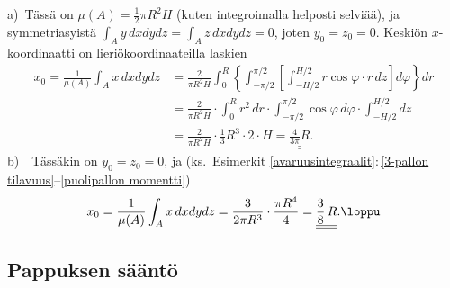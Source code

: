 \ratk a)\ Tässä on $\mu(A)=\frac{1}{2}\pi R^2H$ (kuten integroimalla helposti selviää), ja
symmetriasyistä $\int_A y\,dxdydz=\int_A z\,dxdydz=0$, joten $y_0=z_0=0$. Keskiön
$x$-koordinaatti on lieriökoordinaateilla laskien
\begin{align*}
x_0  = \frac{1}{\mu(A)}\int_A x\,dxdydz
    &= \frac{2}{\pi R^2H}\int_0^R\left\{\int_{-\pi/2}^{\pi/2}\left[\int_{-H/2}^{H/2}
         r\cos\varphi \cdot r\,dz\right]d\varphi\right\}dr \\
    &= \frac{2}{\pi R^2H}\cdot\int_0^R r^2\,dr\cdot\int_{-\pi/2}^{\pi/2}\cos\varphi\,d\varphi
                                             \cdot\int_{-H/2}^{H/2} dz \\
    &= \frac{2}{\pi R^2H} \cdot \frac{1}{3}R^3 \cdot 2 \cdot H
     =\underline{\underline{\frac{4}{3\pi}R}}.
\end{align*}
b)\ \, Tässäkin on $y_0=z_0=0$, ja
(ks.\ Esimerkit \ref{avaruusintegraalit}:\,\ref{3-pallon tilavuus}--\ref{puolipallon momentti})
\[
x_0=\frac{1}{\mu(A)}\int_A x\,dxdydz = \frac{3}{2\pi R^3}\cdot\frac{\pi R^4}{4} 
                                     = \underline{\underline{\frac{3}{8}\,R}}. \loppu
\]

\subsection{Pappuksen sääntö}

